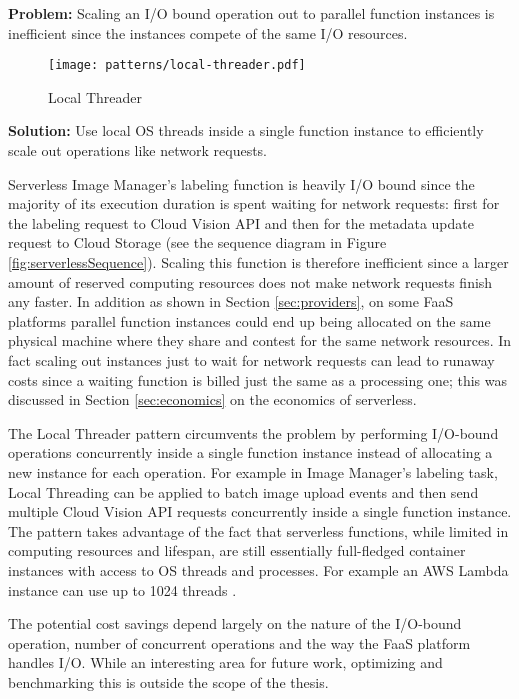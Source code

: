 \textbf{Problem:} Scaling an I/O bound operation out to parallel function instances is inefficient since the instances compete of the same I/O resources.

\begin{figure}[h]
  \centering
  \texttt{[image: patterns/local-threader.pdf]}
  \caption{Local Threader}
  \label{fig:localThreader}
\end{figure}

\textbf{Solution:} Use local OS threads inside a single function instance to efficiently scale out operations like network requests.

Serverless Image Manager's labeling function is heavily I/O bound since the majority of its execution duration is spent waiting for network requests: first for the labeling request to Cloud Vision API and then for the metadata update request to Cloud Storage (see the sequence diagram in Figure \ref{fig:serverlessSequence}). Scaling this function is therefore inefficient since a larger amount of reserved computing resources does not make network requests finish any faster. In addition as shown in Section \ref{sec:providers}, on some FaaS platforms parallel function instances could end up being allocated on the same physical machine where they share and contest for the same network resources. In fact scaling out instances just to wait for network requests can lead to runaway costs since a waiting function is billed just the same as a processing one; this was discussed in Section \ref{sec:economics} on the economics of serverless.

The Local Threader pattern circumvents the problem by performing I/O-bound operations concurrently inside a single function instance instead of allocating a new instance for each operation. For example in Image Manager's labeling task, Local Threading can be applied to batch image upload events and then send multiple Cloud Vision API requests concurrently inside a single function instance. The pattern takes advantage of the fact that serverless functions, while limited in computing resources and lifespan, are still essentially full-fledged container instances with access to OS threads and processes. For example an AWS Lambda instance can use up to 1024 threads \parencite{awslambda0218}.

The potential cost savings depend largely on the nature of the I/O-bound operation, number of concurrent operations and the way the FaaS platform handles I/O. While an interesting area for future work, optimizing and benchmarking this is outside the scope of the thesis.


